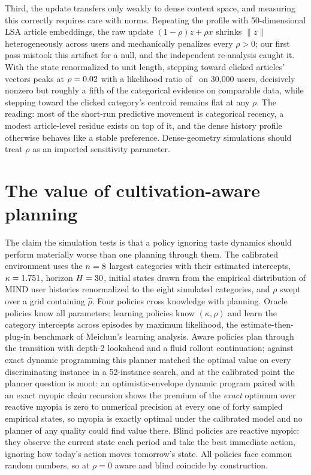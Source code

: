 \documentclass[11pt]{article}
\begin{document}
Third, the update transfers only weakly to dense content space, and
measuring this correctly requires care with norms. Repeating the profile
with 50-dimensional LSA article embeddings, the raw update
$(1-\rho)z+\rho x$ shrinks $\lVert z\rVert$ heterogeneously across users
and mechanically penalizes every $\rho>0$; our first pass mistook this
artifact for a null, and the independent re-analysis caught it. With the
state renormalized to unit length, stepping toward clicked articles'
vectors peaks at $\rho=0.02$ with a likelihood ratio of
\LRdensearticle\ on 30{,}000 users, decisively nonzero but roughly a fifth
of the categorical evidence on comparable data, while stepping toward the
clicked category's centroid remains flat at any $\rho$. The
reading: most of the short-run predictive movement is categorical recency,
a modest article-level residue exists on top of it, and the dense history
profile otherwise behaves like a stable preference. Dense-geometry
simulations should treat $\rho$ as an imported sensitivity parameter.

\section{The value of cultivation-aware planning}\label{sec:sim}

The claim the simulation tests is that a policy ignoring taste dynamics
should perform materially worse than one planning through them. The
calibrated environment uses the $n=8$ largest categories with their
estimated intercepts, $\kappa=1.751$, horizon $H=30$, initial states
drawn from the empirical distribution of MIND user histories renormalized to
the eight simulated categories, and $\rho$ swept over a grid containing
$\hat\rho$. Four policies cross knowledge with planning. Oracle policies
know all parameters; learning policies know $(\kappa,\rho)$ and learn the
category intercepts across episodes by maximum likelihood, the
estimate-then-plug-in benchmark of Meichun's learning analysis. Aware policies plan through the transition
with depth-2 lookahead and a fluid rollout continuation; against exact
dynamic programming this planner matched the optimal value on every
discriminating instance in a 52-instance search, and at the calibrated
point the planner question is moot: an optimistic-envelope dynamic
program paired with an exact myopic chain recursion shows the premium of
the \emph{exact} optimum over reactive myopia is zero to numerical
precision at every one of forty sampled empirical states, so myopia is
exactly optimal under the calibrated model and no planner of any quality
could find value there. Blind policies are reactive myopic: they observe
the current state each period and take the best immediate action, ignoring
how today's action moves tomorrow's state. All policies face common random
numbers, so at $\rho=0$ aware and blind coincide by construction.
\end{document}
